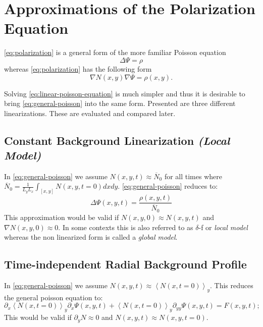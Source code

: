 \documentclass[master.tex]{subfiles}
\begin{document}
\section{Approximations of the Polarization Equation} \label{sec:polarization-linearizations}
\autoref{eq:polarization} is a general form of the more familiar Poisson equation
\begin{equation}\label{eq:linear-poisson-equation}
    \Delta \Psi = \rho 
\end{equation}
whereas \autoref{eq:polarization} has the following form
\begin{equation}\label{eq:general-poisson}
    \nabla N(x,y) \nabla \Psi = \rho(x,y).
\end{equation}

Solving \autoref{eq:linear-poisson-equation} is much simpler and thus it is desirable to bring \autoref{eq:general-poisson} into the same form. Presented are three different linearizations. These are evaluated and compared later.

\subsection{Constant Background Linearization \textit{(Local Model)}}

In \autoref{eq:general-poisson} we assume $N(x,y, t) \approx \overline{N}_0$ for all times where $\overline{N}_0=\frac{1}{L_yL_x}\int_{[x,y]} N(x,y, t = 0) dx dy$. \autoref{eq:general-poisson} reduces to:
\begin{equation}
    \Delta \Psi(x,y,t) = \frac{\rho(x,y,t)}{\overline{N}_0}
\end{equation}
This approximation would be valid if $N(x,y, 0) \approx N(x,y,t)$ and $\nabla N(x,y,0) \approx 0$. In some contexts this is also referred to as  $\delta$-f or \textit{local model} whereas the non linearized form is called a \textit{global model}.

\subsection{Time-independent Radial Background Profile}
In \autoref{eq:general-poisson} we assume $N(x,y,t) \approx \left<N(x,t = 0)\right>_y$. This reduces the general poisson equation to:
\begin{equation}
    \partial_x \left<N(x,t = 0)\right>_y \partial_x \Psi(x,y,t) + \left<N(x,t = 0)\right>_y \partial_{yy} \Psi(x,y,t) = F(x,y,t);
\end{equation}
This would be valid if $\partial_y N \approx 0$ and $N(x,y,t) \approx N(x,y, t= 0)$.
\end{document}
